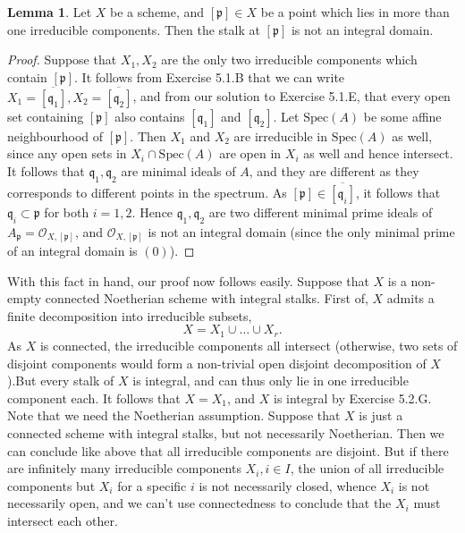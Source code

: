 \documentclass{article}
\theoremstyle{definition}
\newtheorem{lemma}[theorem]{Lemma}
\newcommand{\oo}{\mathcal{O}}
\newcommand{\Spec}{\text{Spec}}
\begin{document}
\begin{lemma}
	Let $X$ be a scheme, and $[\mathfrak{p}] \in X$ be a point which lies in
	more than one irreducible components. Then the stalk at $[\mathfrak{p}]$ is
	not an integral domain.
\end{lemma}
\begin{proof}
	Suppose that $X_1, X_2$ are the only two irreducible components which
	contain $[\mathfrak{p}]$. It follows from Exercise 5.1.B that we can write
	$X_1 = \overline{[\mathfrak{q}_1]}, X_2 = \overline{[\mathfrak{q}_2]}$, and
	from our solution to Exercise 5.1.E, that every open set containing
	$[\mathfrak{p}]$ also contains $[\mathfrak{q}_1]$ and $[\mathfrak{q}_2]$.
	Let $\Spec(A)$ be some affine neighbourhood of $[\mathfrak{p}]$. Then $X_1$
	and $X_2$ are irreducible in $\Spec(A)$ as well, since any open sets in
	$X_i \cap \Spec(A)$ are open in $X_i$ as well and hence intersect. It
	follows that $\mathfrak{q}_1, \mathfrak{q}_2$ are minimal ideals of $A$,
	and they are different as they corresponds to different points in the
	spectrum. As $[\mathfrak{p}] \in \overline{[\mathfrak{q}_i]}$, it follows
	that $\mathfrak{q}_i \subset \mathfrak{p}$ for both $i = 1,2$. Hence
	$\mathfrak{q}_1, \mathfrak{q}_2$ are two different minimal prime ideals of
	$A_{\mathfrak{p}} = \oo_{X, [\mathfrak{p}]}$, and $\oo_{X, [\mathfrak{p}]}$
	is not an integral domain (since the only minimal prime of an integral
	domain is $(0)$).
\end{proof}

With this fact in hand, our proof now follows easily. Suppose that $X$ is a
non-empty connected Noetherian scheme with integral stalks. First of, $X$
admits a finite decomposition into irreducible subsets,
\[
	X = X_1 \cup \ldots \cup X_r.
\] 
As $X$ is connected, the irreducible components all intersect (otherwise, two
sets of disjoint components would form a non-trivial open disjoint
decomposition of $X$).But every stalk of $X$ is integral, and can thus only lie
in one irreducible component each. It follows that $X = X_1$, and $X$ is
integral by Exercise 5.2.G. \\

Note that we need the Noetherian assumption. Suppose that $X$ is just a
connected scheme with integral stalks, but not necessarily Noetherian. Then we
can conclude like above that all irreducible components are disjoint. But if
there are infinitely many irreducible components $X_i, i \in I$, the union of
all irreducible components but $X_i$ for a specific $i$ is not necessarily
closed, whence $X_i$ is not necessarily open, and we can't use connectedness to
conclude that the $X_i$ must intersect each other.
\end{document}
